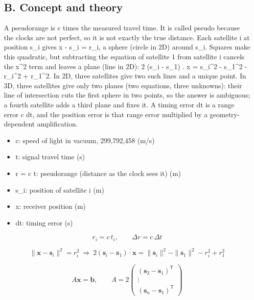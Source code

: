 \documentclass[11pt,a4paper]{article}
\begin{document}
\subsection*{B. Concept and theory}
A pseudorange is c times the measured travel time. It is called pseudo because the clocks are not perfect, so it is not exactly the true distance. Each satellite i at position s\_i gives \textbar{}x - s\_i\textbar{} = r\_i, a sphere (circle in 2D) around s\_i. Squares make this quadratic, but subtracting the equation of satellite 1 from satellite i cancels the \textbar{}x\textbar{}\textasciicircum{}2 term and leaves a plane (line in 2D): 2 (s\_i - s\_1) . x = \textbar{}s\_i\textbar{}\textasciicircum{}2 - \textbar{}s\_1\textbar{}\textasciicircum{}2 - r\_i\textasciicircum{}2 + r\_1\textasciicircum{}2. In 2D, three satellites give two such lines and a unique point. In 3D, three satellites give only two planes (two equations, three unknowns): their line of intersection cuts the first sphere in two points, so the answer is ambiguous; a fourth satellite adds a third plane and fixes it. A timing error dt is a range error c dt, and the position error is that range error multiplied by a geometry-dependent amplification.

\begin{itemize}[nosep]
\item c: speed of light in vacuum, 299,792,458 (m/s)
\item t: signal travel time (s)
\item r = c t: pseudorange (distance as the clock sees it) (m)
\item s\_i: position of satellite i (m)
\item x: receiver position (m)
\item dt: timing error (s)
\end{itemize}

\begin{equation*}
r_i=c\,t_i,\qquad \Delta r=c\,\Delta t
\end{equation*}

\begin{equation*}
\|\mathbf x-\mathbf s_i\|^2=r_i^2\ \Longrightarrow\ 2(\mathbf s_i-\mathbf s_1)\cdot\mathbf x=\|\mathbf s_i\|^2-\|\mathbf s_1\|^2-r_i^2+r_1^2
\end{equation*}

\begin{equation*}
A\mathbf x=\mathbf b,\qquad A=2\begin{pmatrix}(\mathbf s_2-\mathbf s_1)^{\mathsf T}\\ \vdots\\ (\mathbf s_n-\mathbf s_1)^{\mathsf T}\end{pmatrix}
\end{equation*}
\end{document}
